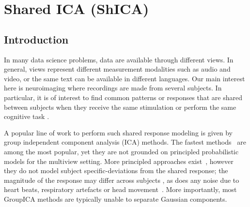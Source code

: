 \documentclass{report}
\begin{document}
{%

\chapter{Shared ICA (ShICA)}
\section{Introduction}
In many data science problems, data are available through different views. In general, views represent different measurement modalities such as audio and video, or the same text can be available in different languages. Our main interest here is neuroimaging where recordings are made from several subjects. In particular, it is of interest to find common patterns or responses that are shared between subjects when they receive the same stimulation or perform the same cognitive task \citep{chen2015reduced,richard2020modeling}. 

A popular line of work to perform such shared response modeling is given by group independent component analysis (ICA) methods. The fastest methods~\cite{calhoun2001method, varoquaux2009canica} are among the most popular, yet they are not grounded on principled probabilistic models for the multiview setting. 
%
More principled approaches exist~\cite{richard2020modeling, guo2008unified}, however they do not model subject specific-deviations from the shared response; the magnitude of the response may differ across subjects \cite{penny2007random}, as does any noise due to heart beats, respiratory artefacts or head movement~\cite{liu2016noise}.
%
More importantly, most GroupICA methods are typically unable to separate Gaussian components.

}
\end{document}
